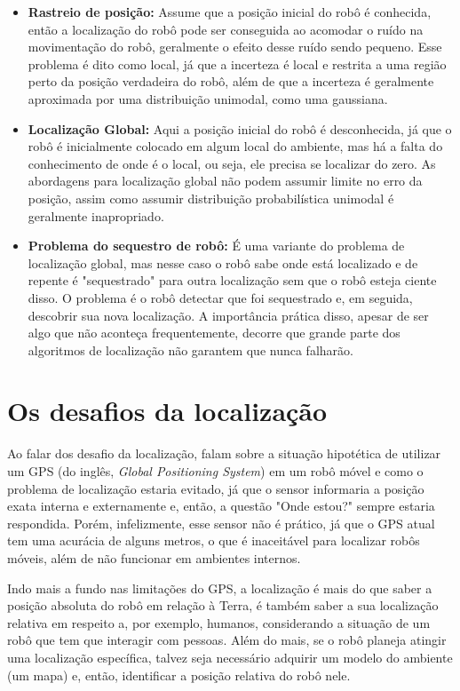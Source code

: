\documentclass[acronym, symbols, table]{fei}
\begin{document}
			\begin{itemize}
				\item \textbf{Rastreio de posição:} Assume que a posição inicial do robô é conhecida, então a localização do robô pode ser conseguida ao acomodar o ruído na movimentação do robô, geralmente o efeito desse ruído sendo pequeno. Esse problema é dito como local, já que a incerteza é local e restrita a uma região perto da posição verdadeira do robô, além de que a incerteza é geralmente aproximada por uma distribuição unimodal, como uma gaussiana.
				
				\item \textbf{Localização Global:} Aqui a posição inicial do robô é desconhecida, já que o robô é inicialmente colocado em algum local do ambiente, mas há a falta do conhecimento de onde é o local, ou seja, ele precisa se localizar do zero. As abordagens para localização global não podem assumir limite no erro da posição, assim como assumir distribuição probabilística unimodal é geralmente inapropriado.
				
				\item \textbf{Problema do sequestro de robô:} É uma variante do problema de localização global, mas nesse caso o robô sabe onde está localizado e de repente é "sequestrado" para outra localização sem que o robô esteja ciente disso. O problema é o robô detectar que foi sequestrado e, em seguida, descobrir sua nova localização. A importância prática disso, apesar de ser algo que não aconteça frequentemente, decorre que grande parte dos algoritmos de localização não garantem que nunca falharão.
			\end{itemize}
			
		\section{Os desafios da localização}
		
			Ao falar dos desafio da localização, \textcite{siegwart2011introduction} falam sobre a situação hipotética de utilizar um GPS (do inglês, \textit{Global Positioning System}) em um robô móvel e como o problema de localização estaria evitado, já que o sensor informaria a posição exata interna e externamente e, então, a questão "Onde estou?" sempre estaria respondida. Porém, infelizmente, esse sensor não é prático, já que o GPS atual tem uma acurácia de alguns metros, o que é inaceitável para localizar robôs móveis, além de não funcionar em ambientes internos. 
			
			Indo mais a fundo nas limitações do GPS, a localização é mais do que saber a posição absoluta do robô em relação à Terra, é também saber a sua localização relativa em respeito a, por exemplo, humanos, considerando a situação de um robô que tem que interagir com pessoas. Além do mais, se o robô planeja atingir uma localização específica, talvez seja necessário adquirir um modelo do ambiente (um mapa) e, então, identificar a posição relativa do robô nele. 
			
\end{document}
